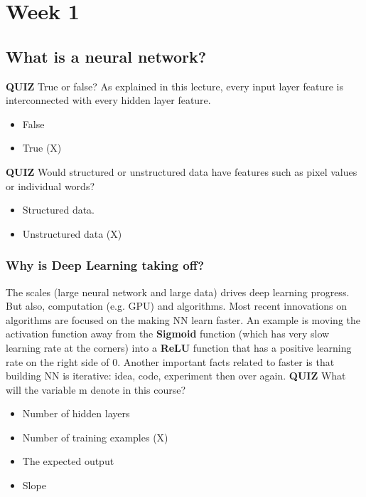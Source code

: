 \section*{Week 1}
\subsection*{What is a neural network?}


\textbf{QUIZ} True or false? As explained in this lecture, every input layer feature is interconnected with every hidden layer feature.
\begin{itemize}
    \item False
    \item True (X)
\end{itemize}
\textbf{QUIZ} Would structured or unstructured data have features such as pixel values or individual words?
\begin{itemize}
    \item Structured data.
    \item Unstructured data (X)
\end{itemize}

\subsubsection*{Why is Deep Learning taking off?}
The scales (large neural network and large data) drives deep learning progress. But also, computation (e.g. GPU) and algorithms.
Most recent innovations on algorithms are focused on the making NN learn faster. An example is moving the activation function away from the \textbf{Sigmoid} function (which has very slow learning rate at the corners) into a \textbf{ReLU} function that has a positive learning rate on the right side of 0.
Another important facts related to faster is that building NN is iterative: idea, code, experiment then over again.
\textbf{QUIZ} What will the variable m denote in this course?
\begin{itemize}
    \item Number of hidden layers
    \item Number of training examples (X)
    \item The expected output
    \item Slope
\end{itemize}

